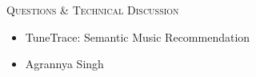 \documentclass[aspectratio=169,10pt]{beamer}
\begin{document}
\begin{frame}[plain]
  \vspace{10mm}
  \centering
  \Huge \textsc{Questions \& Technical Discussion}
  \vspace{5mm}
  \normalsize
  \begin{itemize}
      \item TuneTrace: Semantic Music Recommendation
      \item Agrannya Singh
  \end{itemize}
\end{frame}
\end{document}
